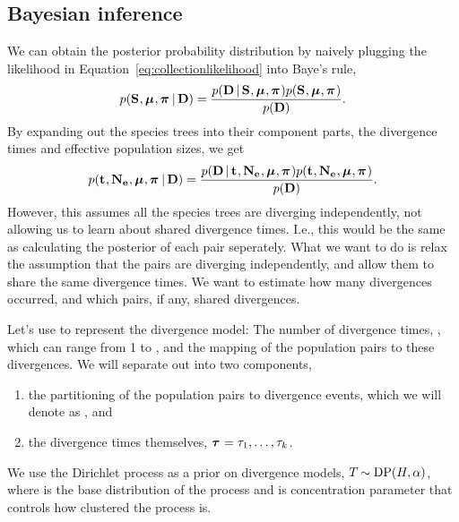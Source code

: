 \subsection{Bayesian inference}

We can obtain the posterior probability distribution by naively plugging the
likelihood in Equation~\ref{eq:collectionlikelihood} into Baye's rule,
\begin{equation}
    \pr(
    \sptrees,
    \murates,
    \gfreqs
    \given
    \alldata
    )
    =
    \frac{
        \pr(
        \alldata
        \given
        \sptrees, \murates, \gfreqs
        )
        \pr(
        \sptrees,
        \murates,
        \gfreqs
        )
    }{
        \pr(
        \alldata
        )
    }.
    \label{eq:collectionindependentbayesrule}
\end{equation}
By expanding out the species trees into their component parts, the divergence
times and effective population sizes, we get
\begin{equation}
    \pr(
    \comparisondivtimes,
    \collectionpopsizes,
    \murates,
    \gfreqs
    \given
    \alldata
    )
    =
    \frac{
        \pr(
        \alldata
        \given
        \comparisondivtimes,
        \collectionpopsizes,
        \murates,
        \gfreqs
        )
        \pr(\comparisondivtimes, \collectionpopsizes, \murates, \gfreqs)
    }{
        \pr(
        \alldata
        )
    }.
    \label{eq:collectionindependentbayesruleexpanded}
\end{equation}
However, this assumes all the species trees are diverging independently, not allowing us
to learn about shared divergence times.
I.e., this would be the same as calculating the posterior of each pair
seperately.
What we want to do is relax the assumption that the pairs are diverging
independently, and allow them to share the same divergence times.
We want to estimate how many divergences occurred, and which pairs, if any,
shared divergences.

Let's use \divtimemodel to represent the divergence model: The number of
divergence times, \nevents, which can range from 1 to \ncomparisons, and the
mapping of the population pairs to these \nevents divergences.
We will separate out \divtimemodel into two components,
\begin{enumerate}
    \item the partitioning of the \ncomparisons population pairs to
        divergence events, which we will denote as \divtimesets, and
    \item the divergence times themselves,
        $\divtimes = \divtime[1], \ldots, \divtime[\nevents]$.
\end{enumerate}
We use the Dirichlet process as a prior on divergence models,
$\divtimemodel \sim \dirp(\basedistribution, \concentration)$,
where \basedistribution is the base distribution of the process and
\concentration is concentration parameter that controls how clustered the
process is.

